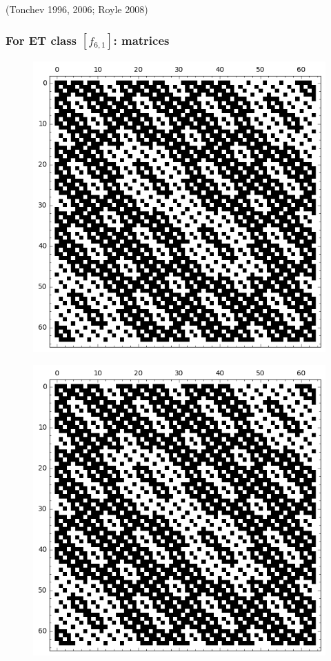\documentclass[pdf,sprung,slideColor,nocolorBG]{beamer}
\newenvironment{colortheme}[1]{
\def\ProvidesPackageRCS $##1${\relax}
\renewcommand{\ProcessOptions}{\relax}
\makeatletter

\makeatother
}{}
\newcommand{\slidecite}[1]{\tiny{(#1)}\normalsize{}}
\begin{document}
\begin{colortheme}{jubata}
\begin{frame}
\slidecite{Tonchev 1996, 2006; Royle 2008}
 \end{frame}
\begin{frame}
\frametitle{For ET class $[f_{6,1}]$: matrices}
\begin{figure}
\centering
\begin{minipage}{.48\textwidth}
  \centering
  \includegraphics[width=.9\linewidth]{../matrix_plot/re6_1_weight_class_matrix.png}
  \label{fig:6_1_weight_class_matrix}
\end{minipage}%
\begin{minipage}{.48\textwidth}
  \centering
  \includegraphics[width=.9\linewidth]{../matrix_plot/re6_1_bent_cayley_graph_index_matrix.png}

\end{minipage}
\end{figure}
\end{frame}
\end{colortheme}
\end{document}
